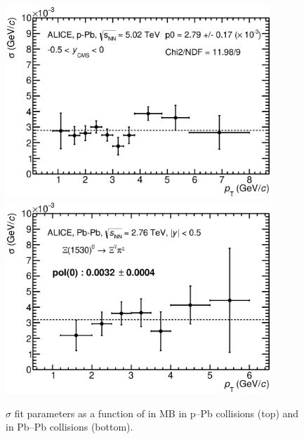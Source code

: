 \begin{figure}[htbp]
\begin{center}
\includegraphics[width=10.0cm]{./Version1/FigChapter5/Extraction/pPbWidthMB.eps}
\hspace{0.5cm}
\includegraphics[width=10.0cm]{./Version1/FigChapter5/Extraction/PbPbWidthMB.eps}
\caption{$\sigma$ fit parameters as a function of \pt in MB in p--Pb collisions (top) and in Pb--Pb collisions (bottom).} 
 \label{fig:sigma}
\end{center}
\end{figure}



